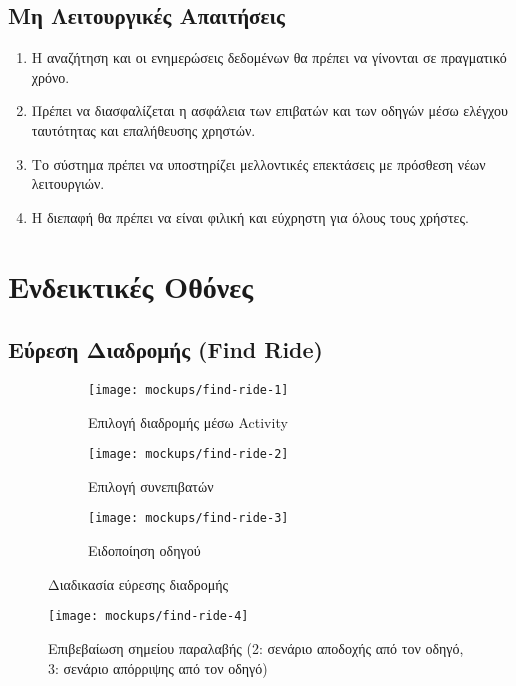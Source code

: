 \subsection{Μη Λειτουργικές Απαιτήσεις}

\begin{enumerate}
    \item Η αναζήτηση και οι ενημερώσεις δεδομένων θα πρέπει να γίνονται σε πραγματικό χρόνο.
    \item Πρέπει να διασφαλίζεται η ασφάλεια των επιβατών και των οδηγών μέσω ελέγχου ταυτότητας
          και επαλήθευσης χρηστών.
    \item Το σύστημα πρέπει να υποστηρίζει μελλοντικές επεκτάσεις με πρόσθεση νέων λειτουργιών.
    \item Η διεπαφή θα πρέπει να είναι φιλική και εύχρηστη για όλους τους χρήστες.
\end{enumerate}

\newpage

\section{Ενδεικτικές Οθόνες}

\subsection{Εύρεση Διαδρομής (Find Ride)}

\begin{figure}[H]
    \centering
    \begin{subfigure}[b]{0.28\textwidth}
        \texttt{[image: mockups/find-ride-1]}
        \caption{Επιλογή διαδρομής μέσω Activity}
    \end{subfigure}
    \hfill
    \begin{subfigure}[b]{0.28\textwidth}
        \texttt{[image: mockups/find-ride-2]}
        \caption{Επιλογή συνεπιβατών}
    \end{subfigure}
    \hfill
    \begin{subfigure}[b]{0.28\textwidth}
        \texttt{[image: mockups/find-ride-3]}
        \caption{Ειδοποίηση οδηγού}
    \end{subfigure}
    \caption{Διαδικασία εύρεσης διαδρομής}
\end{figure}

\begin{figure}[H]
    \centering
    \texttt{[image: mockups/find-ride-4]}
    \caption{Επιβεβαίωση σημείου παραλαβής (2: σενάριο αποδοχής από τον οδηγό, 3: σενάριο απόρριψης από τον οδηγό)}
\end{figure}

